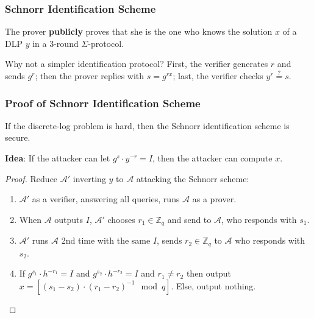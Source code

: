 \begin{frame}\frametitle{Schnorr Identification Scheme}
The prover \textbf{publicly} proves that she is the one who knows 
the solution $x$ of a DLP $y$ in a 3-round $\Sigma$-protocol. 
\begin{figure}
\begin{center}

\end{center}
\end{figure} 
\begin{exampleblock}{Why not a simpler identification protocol?}
First, the verifier generates $r$ and sends $g^r$; then the prover replies with $s = g^{rx}$; last, the verifier checks $y^r \overset{?}{=} s$.
\end{exampleblock}
\end{frame}

\begin{frame}\frametitle{Proof of Schnorr Identification Scheme}
	\begin{theorem}
		If the discrete-log problem is hard, then the Schnorr identification scheme is secure.
	\end{theorem}
\textbf{Idea}: If the attacker can let $g^s \cdot y^{-r} = I$, then the attacker can compute $x$.
\begin{proof}
Reduce $\mathcal{A}'$ inverting $y$ to $\mathcal{A}$ attacking the Schnorr scheme:
\begin{enumerate}
\item $\mathcal{A}'$ as a verifier, answering all queries, runs $\mathcal{A}$ as a prover.
\item When $\mathcal{A}$ outputs $I$, $\mathcal{A}'$ chooses $r_1 \in \mathbb{Z}_q$ and send to $\mathcal{A}$, who responds with $s_1$.
\item $\mathcal{A}'$ runs $\mathcal{A}$ 2nd time with the same $I$, sends $r_2 \in \mathbb{Z}_q$ to  $\mathcal{A}$ who responds with $s_2$. 
\item If $g^{s_1} \cdot h^{-r_1} = I$ and $g^{s_2} \cdot h^{-r_2} = I$ and $r_1 \neq r_2$ then output $x = [ (s_1 - s_2)\cdot (r_1 - r_2)^{-1} \mod q]$. Else, output nothing.
\end{enumerate}
\end{proof}
\end{frame}

